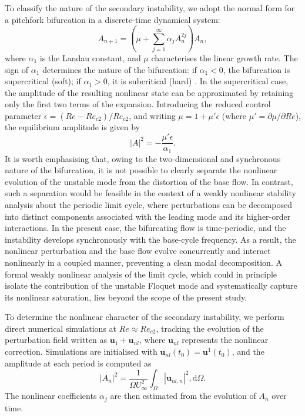 To classify the nature of the secondary instability, we adopt the normal form for a pitchfork bifurcation in a discrete-time dynamical system:
%
\begin{equation}
A_{n+1} = \left( \mu + \sum_{j=1}^{\infty} \alpha_j A_n^{2j} \right) A_n,
\end{equation}
%
where $\alpha_1$ is the Landau constant, and $\mu$ characterises the linear growth rate. The sign of $\alpha_1$ determines the nature of the bifurcation: if $\alpha_1<0$, the bifurcation is supercritical (soft); if $\alpha_1>0$, it is subcritical (hard) \citep{kuznetsov-1997}. In the supercritical case, the amplitude of the resulting nonlinear state can be approximated by retaining only the first two terms of the expansion. Introducing the reduced control parameter $\epsilon = (Re-Re_{c2})/Re_{c2}$, and writing $\mu = 1 + \mu' \epsilon$ (where $\mu'  = \partial \mu/\partial Re$), the equilibrium amplitude is given by
%
\begin{equation}
|A|^2 = - \frac{\mu' \epsilon}{\alpha_1}.
\end{equation}
%
It is worth emphasising that, owing to the two-dimensional and synchronous nature of the bifurcation, it is not possible to clearly separate the nonlinear evolution of the unstable mode from the distortion of the base flow. In contrast, such a separation would be feasible in the context of a weakly nonlinear stability analysis about the periodic limit cycle, where perturbations can be decomposed into distinct components associated with the leading mode and its higher-order interactions. In the present case, the bifurcating flow is time-periodic, and the instability develops synchronously with the base-cycle frequency. As a result, the nonlinear perturbation and the base flow evolve concurrently and interact nonlinearly in a coupled manner, preventing a clean modal decomposition. A formal weakly nonlinear analysis of the limit cycle, which could in principle isolate the contribution of the unstable Floquet mode and systematically capture its nonlinear saturation, lies beyond the scope of the present study.

To determine the nonlinear character of the secondary instability, we perform direct numerical simulations at $Re\approx Re_{c2}$, tracking the evolution of the perturbation field written as $\bm{u}_1 + \bm{u}_{nl}$, where $\bm{u}_{nl}$ represents the nonlinear correction. Simulations are initialised with $\bm{u}_{nl}(t_0) = \bm{u}^1(t_0)$, and the amplitude at each period is computed as
%
\begin{equation}
|A_n|^2 = \frac{1}{\Omega U_\infty^2} \int_\Omega |\bm{u}_{nl,n}|^2, \mathrm{d} \Omega.
\end{equation}
%
The nonlinear coefficients $\alpha_j$ are then estimated from the evolution of $A_n$ over time.

